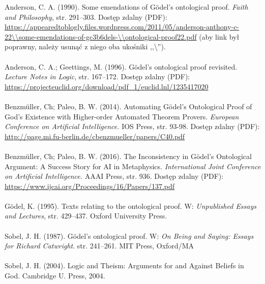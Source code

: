 \documentclass[12pt]{article}
\begin{document}
\begin{multicols}{2}
\noindent [Anderson, 1990] Anderson, C. A. (1990). Some emendations of G\"odel’s ontological proof. \textit{Faith and Philosophy}, str. 291–303. Dostęp zdalny (PDF): \url{https://appearedtoblogly.files.wordpress.com/2011/05/anderson-anthony-c-22\\some-emendations-of-gc3b6dels-\\ontological-proof22.pdf} (aby link był poprawny, należy usunąć z niego oba ukośniki ,,\textbackslash''). 
\\ \\
\noindent [Anderson, 1996] Anderson, C. A.; Geettings, M. (1996). G\"odel’s ontological proof revisited. \textit{Lecture Notes in Logic}, str. 167–172. Dostęp zdalny (PDF): \url{https://projecteuclid.org/download/pdf_1/euclid.lnl/1235417020}
\\ \\
 Benzm\"uller, Ch; Paleo, B. W. (2014). Automating G\"odel’s Ontological Proof of God’s Existence with Higher-order Automated Theorem Provers. \textit{European Conference on Artificial Intelligence.} IOS Press, str. 93-98. Dostęp zdalny (PDF): \url{http://page.mi.fu-berlin.de/cbenzmueller/papers/C40.pdf}
\\ \\
 Benzm\"uller, Ch; Paleo, B. W. (2016). The Inconsistency in G\"odel's Ontological Argument: A Success Story for AI in Metaphysics. \textit{International Joint Conference on Artificial Intelligence.} AAAI Press, str. 936. Dostęp zdalny (PDF): \url{https://www.ijcai.org/Proceedings/16/Papers/137.pdf}
\\ \\ 
\noindent [G\"odel, 1995] G\"odel, K. (1995). Texts relating to the ontological proof. W: \textit{Unpublished Essays and Lectures}, str. 429–437. Oxford University Press. 
\\ \\ 
\noindent [Sobel, 1987] Sobel, J. H. (1987). G\"odel’s ontological proof. W: \textit{On Being and Saying: Essays for Richard Catwright}. str. 241–261. MIT Press, Oxford/MA
\\ \\ 
\noindent [Sobel, 2004] Sobel, J. H. (2004). Logic and Theism: Arguments for and Against Beliefs in God. Cambridge U. Press, 2004.

\end{multicols}
\end{document}
